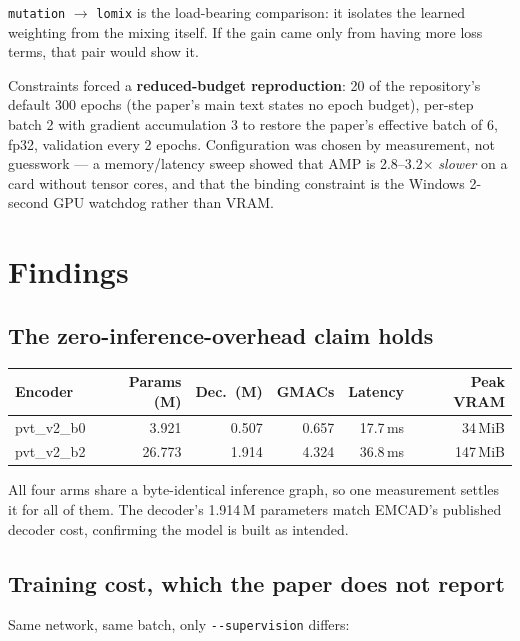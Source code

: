 \documentclass[11pt,a4paper]{article}
\newcommand{\code}[1]{\texttt{\small #1}}
\begin{document}
\code{mutation} $\rightarrow$ \code{lomix} is the load-bearing comparison: it
isolates the learned weighting from the mixing itself. If the gain came only
from having more loss terms, that pair would show it.

Constraints forced a \textbf{reduced-budget reproduction}: 20 of the
repository's default 300 epochs (the paper's main text states no epoch budget), per-step batch 2 with gradient accumulation 3 to restore the paper's
effective batch of 6, fp32, validation every 2 epochs. Configuration was chosen
by measurement, not guesswork --- a memory/latency sweep showed that AMP is
2.8--3.2$\times$ \emph{slower} on a card without tensor cores, and that the
binding constraint is the Windows 2-second GPU watchdog rather than VRAM.

\section{Findings}

\subsection{The zero-inference-overhead claim holds}

\begin{center}
\begin{tabular}{@{}lrrrrr@{}}
\toprule
\textbf{Encoder} & \textbf{Params (M)} & \textbf{Dec.\ (M)} & \textbf{GMACs} &
\textbf{Latency} & \textbf{Peak VRAM} \\
\midrule
pvt\_v2\_b0 & 3.921 & 0.507 & 0.657 & 17.7\,ms & 34\,MiB \\
pvt\_v2\_b2 & 26.773 & 1.914 & 4.324 & 36.8\,ms & 147\,MiB \\
\bottomrule
\end{tabular}
\end{center}

All four arms share a byte-identical inference graph, so one measurement settles
it for all of them. The decoder's 1.914\,M parameters match EMCAD's published
decoder cost, confirming the model is built as intended.

\subsection{Training cost, which the paper does not report}

Same network, same batch, only \code{-{}-supervision} differs:
\end{document}
